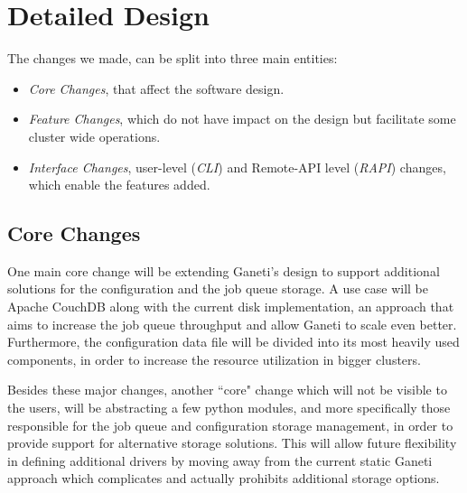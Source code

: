 \section{Detailed Design}\label{sec:des}

The changes we made, can be split into three main entities:

\begin{itemize}
  \item \emph{Core Changes}, that affect the software design.
  \item \emph{Feature Changes}, which do not have impact on the design but
        facilitate some cluster wide operations.
  \item \emph{Interface Changes}, user-level (\emph{CLI}) and Remote-API level
        (\emph{RAPI}) changes, which enable the features added.
\end{itemize}

\subsection{Core Changes}

One main core change will be extending Ganeti's design to support additional
solutions for the configuration and the job queue storage. A use case will be
Apache CouchDB along with the current disk implementation, an approach that
aims to increase the job queue throughput and allow Ganeti to scale even
better. Furthermore, the configuration data file will be divided into its most
heavily used components, in order to increase the resource utilization in bigger
clusters.

Besides these major changes, another ``core" change which will not be visible
to the users, will be abstracting a few python modules, and more specifically
those responsible for the job queue and configuration storage management, in
order to provide support for alternative storage solutions. This will allow
future flexibility in defining additional drivers by moving away from the
current static Ganeti approach which complicates and actually prohibits
additional storage options.

